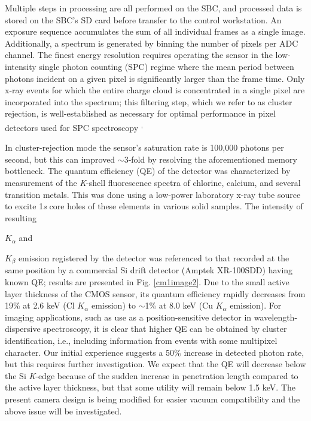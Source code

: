 \FloatBarrier

Multiple steps in processing are all performed on the SBC, and processed
data is stored on the SBC's SD card before transfer to the control
workstation. An exposure sequence accumulates the sum of all individual
frames as a single image. Additionally, a spectrum is generated by
binning the number of pixels per ADC channel. The finest energy
resolution requires operating the sensor in the low-intensity single
photon counting (SPC) regime where the mean period between photons
incident on a given pixel is significantly larger than the frame time.
Only x-ray events for which the entire charge cloud is concentrated in a
single pixel are incorporated into the spectrum; this filtering step,
which we refer to as cluster rejection, is well-established as necessary
for optimal performance in pixel detectors used for SPC
spectroscopy \cite{servoli2010characterization}\textsuperscript{,}

In cluster-rejection mode the sensor's saturation rate is 100,000
photons per second, but this can improved $\sim$3-fold by
resolving the aforementioned memory bottleneck. The quantum efficiency
(QE) of the detector was characterized by measurement of the
\emph{K}-shell fluorescence spectra of chlorine, calcium, and several
transition metals. This was done using a low-power laboratory x-ray tube
source to excite 1\emph{s} core holes of these elements in various solid
samples. The intensity of resulting
\(K_{\alpha}\)
and
\(K_{\beta}\)
emission registered by the detector was referenced to that recorded at
the same position by a commercial Si drift detector (Amptek XR-100SDD)
having known QE; results are presented in Fig. \ref{cm1image2}. Due to the small
active layer thickness of the CMOS sensor, its quantum efficiency
rapidly decreases from 19\% at 2.6 keV (Cl \(K_{\alpha}\) emission) to
$\sim$1\% at 8.0 keV (Cu \(K_{\alpha}\) emission). For
imaging applications, such as use as a position-sensitive detector in
wavelength-dispersive spectroscopy, it is clear that higher QE can be
obtained by cluster identification, i.e., including information from
events with some multipixel character. Our initial experience suggests a
50\% increase in detected photon rate, but this requires further
investigation. We expect that the QE will decrease below the Si
\emph{K}-edge because of the sudden increase in penetration length
compared to the active layer thickness, but that some utility will
remain below 1.5 keV. The present camera design is being modified for
easier vacuum compatibility and the above issue will be investigated.

